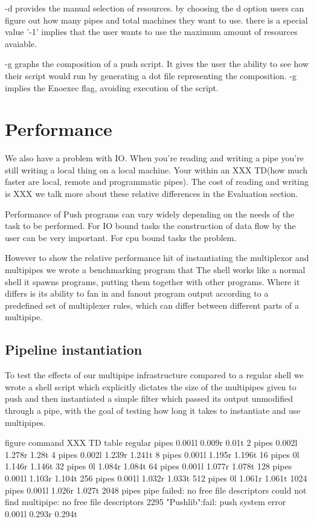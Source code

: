 \documentclass[11pt, letterpaper]{article}
\begin{document}
-d provides the manual selection of resources. by choosing the d option users can figure out how many pipes and total machines they want to use. there is a special value '-1' implies that the user wants to use the maximum amount of resources avaiable. 

-g graphs the composition of a push script. It gives the user the ability to see how their script would run by generating a dot file representing the composition. -g implies the Enoexec flag, avoiding execution of the script. 

 
\section{Performance}

We also have a problem with IO. When you're reading and writing a pipe you're still writing a local thing on a local machine. Your within an XXX TD(how much faster are local, remote and programmatic pipes). The cost of reading and writing is XXX we talk more about these relative differences in the Evaluation section.   

Performance of Push programs can vary widely depending on the needs of the task to be performed. For IO bound tasks the construction of data flow by the user can be very important. For cpu bound tasks the problem. 

However to show the relative performance hit of instantiating the multiplexor and multipipes we wrote a benchmarking program that 
The shell works like a normal shell it spawns programs, putting them together with other programs. Where it differs is its ability to fan in and fanout program output according to a predefined set of multiplexer rules, which can differ between different parts of a multipipe. 

\subsection{Pipeline instantiation}

To test the effects of our multipipe infrastructure compared to a regular shell we wrote a shell script which explicitly dictates the size of the multipipes given to push and then instantiated a simple filter which passed its output unmodified through a pipe, with the goal of testing how long it takes to instantiate and use multipipes.

figure{
command XXX TD
}
table{
regular pipes
0.001l 0.009r 0.01t
2 pipes
0.002l 1.278r 1.28t
4 pipes
0.002l 1.239r 1.241t
8 pipes
0.001l 1.195r 1.196t
16 pipes
0l 1.146r 1.146t
32 pipes
0l 1.084r 1.084t
64 pipes
0.001l 1.077r 1.078t
128 pipes
0.001l 1.103r 1.104t
256 pipes
0.001l 1.032r 1.033t
512 pipes
0l 1.061r 1.061t
1024 pipes
0.001l 1.026r 1.027t
2048 pipes
pipe failed: no free file descriptors
could not find multipipe: no free file descriptors
2295 "Pushlib":fail: push system error
0.001l 0.293r 0.294t
}
\end{document}
